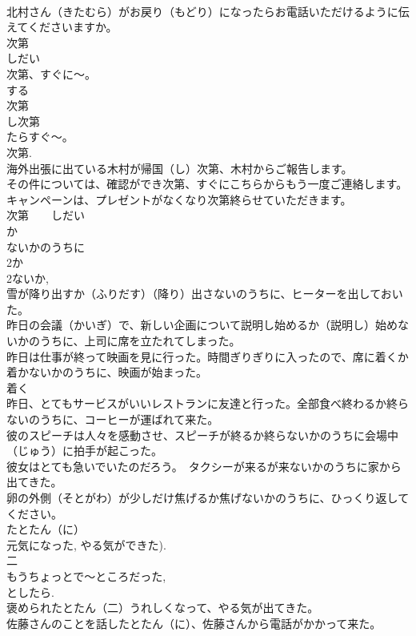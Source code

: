 \documentclass[8pt]{extreport}
\begin{document}
\begin{CJK}{UTF8}{min}
\\	北村さん（きたむら）がお戻り（もどり）になったらお電話いただけるように伝えてくださいますか。
\\	次第
\\	しだい
\\	次第、すぐに～。 
\\	する 
\\	次第 
\\	し次第 
\\	たらすぐ～。 
\\	次第.
\\	海外出張に出ている木村が帰国（し）次第、木村からご報告します。
\\	その件については、確認ができ次第、すぐにこちらからもう一度ご連絡します。
\\	キャンペーンは、プレゼントがなくなり次第終らせていただきます。
\\	次第　　しだい
\\	か
\\	ないかのうちに
\\	2か
\\	2ないか, 
\\	雪が降り出すか（ふりだす）（降り）出さないのうちに、ヒーターを出しておいた。
\\	昨日の会議（かいぎ）で、新しい企画について説明し始めるか（説明し）始めないかのうちに、上司に席を立たれてしまった。
\\	昨日は仕事が終って映画を見に行った。時間ぎりぎりに入ったので、席に着くか着かないかのうちに、映画が始まった。
\\	着く 
\\	昨日、とてもサービスがいいレストランに友達と行った。全部食べ終わるか終らないのうちに、コーヒーが運ばれて来た。
\\	彼のスピーチは人々を感動させ、スピーチが終るか終らないかのうちに会場中（じゅう）に拍手が起こった。
\\	彼女はとても急いでいたのだろう。　タクシーが来るが来ないかのうちに家から出てきた。
\\	卵の外側（そとがわ）が少しだけ焦げるか焦げないかのうちに、ひっくり返してください。
\\	たとたん（に）
\\	元気になった, やる気ができた).
\\	二 
\\	もうちょっとで～ところだった, 
\\	としたら.
\\	褒められたとたん（二）うれしくなって、やる気が出てきた。
\\	佐藤さんのことを話したとたん（に）、佐藤さんから電話がかかって来た。

\end{CJK}
\end{document}
